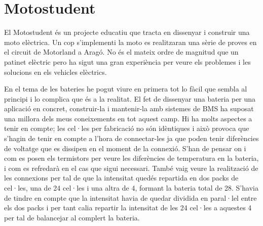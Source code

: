 \chapter{Motostudent}
\label{chap:motostudent}

El Motostudent és un projecte educatiu que tracta en dissenyar i construir una moto elèctrica. Un cop s'implementi la moto es realitzaran una sèrie de proves en el circuit de Motorland a Aragó. No és el mateix ordre de magnitud que un patinet elèctric pero ha sigut una gran experiència per veure els problemes i les solucions en els vehicles elèctrics.

En el tema de les bateries he pogut viure en primera tot lo fàcil que sembla al principi i lo complica que és a la realitat. El fet de dissenyar una bateria per una aplicació en concret, construir-la i mantenir-la amb sistemes de BMS ha suposat una millora dels meus coneixements en tot aquest camp. Hi ha molts aspectes a tenir en compte; les cel·les per fabricació no són idèntiques i això provoca que s'hagin de tenir en compte a l'hora de connectar-les ja que poden tenir diferències de voltatge que es dissipen en el moment de la connexió. S'han de pensar on i com es posen els termistors per veure les diferències de temperatura en la bateria, i com es refredarà en el cas que sigui necessari. També vaig veure la realització de les connexions per tal de que la intensitat quedés repartida en dos packs de cel·les, una de 24 cel·les i una altra de 4, formant la bateria total de 28. S'havia de tindre en compte que la intensitat havia de quedar dividida en paral·lel entre els dos packs i per tant calia repartir la intensitat de les 24 cel·les a aquestes 4 per tal de balancejar al complert la bateria. 

